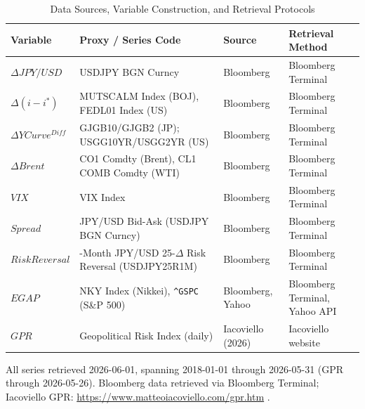 \documentclass[12pt]{article}
\begin{document}
\begin{landscape}
\thispagestyle{empty}
\begin{table}[htbp]
  \centering
  \small
  \renewcommand{\arraystretch}{1.15}
  \setlength{\tabcolsep}{6pt}
  \begin{threeparttable}
    \caption{Data Sources, Variable Construction, and Retrieval Protocols}
    \label{tab:datasources}
    \begin{tabularx}{\linewidth}{@{}l>{\RaggedRight}X>{\RaggedRight\arraybackslash}p{2.8cm}>{\RaggedRight\arraybackslash}p{4.8cm}@{}}
        \toprule
        Variable & Proxy / Series Code & Source & Retrieval Method \\
        \midrule
        $\Delta JPY/USD$ & USDJPY BGN Curncy & Bloomberg & Bloomberg Terminal \\
        $\Delta(i-i^*)$ & MUTSCALM Index (BOJ), FEDL01 Index (US) & Bloomberg & Bloomberg Terminal \\
        $\Delta YCurve^{Diff}$ & GJGB10/GJGB2 (JP); USGG10YR/USGG2YR (US) & Bloomberg & Bloomberg Terminal \\
        $\Delta Brent$ & CO1 Comdty (Brent), CL1 COMB Comdty (WTI) & Bloomberg & Bloomberg Terminal \\
        $VIX$ & VIX Index & Bloomberg & Bloomberg Terminal \\
        $Spread$ & JPY/USD Bid-Ask (USDJPY BGN Curncy) & Bloomberg & Bloomberg Terminal \\
        $RiskReversal$ & 1-Month JPY/USD 25-$\Delta$ Risk Reversal (USDJPY25R1M) & Bloomberg & Bloomberg Terminal \\
        $EGAP$ & NKY Index (Nikkei), \texttt{\textasciicircum GSPC} (S\&P 500) & Bloomberg, Yahoo & Bloomberg Terminal, Yahoo API \\
        $GPR$ & Geopolitical Risk Index (daily) & Iacoviello (2026) & Iacoviello website \\
        \bottomrule
      \end{tabularx}
    \begin{tablenotes}
      \item \footnotesize All series retrieved 2026-06-01, spanning 2018-01-01 through 2026-05-31 (GPR through 2026-05-26). Bloomberg data retrieved via Bloomberg Terminal; Iacoviello GPR: \url{https://www.matteoiacoviello.com/gpr.htm} \parencite{iacoviello2026gpr}.
      \end{tablenotes}
  \end{threeparttable}
\end{table}
\end{landscape}
\end{document}
